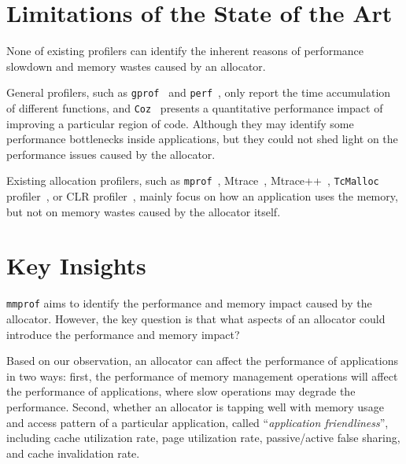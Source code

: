 \documentclass[pageno]{jpaper}
\newcommand{\MP}{\texttt{mmprof}}
\begin{document}
\section{Limitations of the State of the Art}
\label{sec:limitations}

None of existing profilers can identify the inherent reasons of performance slowdown and memory wastes caused by an allocator. 

General profilers, such as \texttt{gprof}~\cite{DBLP:conf/sigplan/GrahamKM82} and \texttt{perf}~\cite{perf}, only report the time accumulation of different functions, and \texttt{Coz}~\cite{Coz} presents a quantitative performance impact of improving a particular region of code. Although they may identify some performance bottlenecks inside applications, but they could not shed light on the performance issues caused by the allocator. 

 Existing allocation profilers, such as \texttt{mprof}~\cite{Zorn:1988:MAP:894814}, Mtrace~\cite{mtrace}, Mtrace++~\cite{Lee:2000:DMM:786772.787150}, \texttt{TcMalloc} profiler~\cite{tcmalloc-profiler}, or CLR profiler~\cite{lupasc2014dynamic}, mainly focus on how an application uses the memory, but not on memory wastes caused by the allocator itself. 


\section{Key Insights}
\label{sec:key-insights}


\MP{} aims to identify the performance and memory impact caused by the allocator. However, the key question is that what aspects of an allocator could introduce the performance and memory impact? 

Based on our observation, an allocator can affect the performance of applications in two ways: first, the performance of memory management operations will affect the performance of applications, where slow operations may degrade the performance.  Second, whether an allocator is tapping well with memory usage and access pattern of a particular application, called ``\textit{application friendliness}'', including cache utilization rate, page utilization rate, passive/active false sharing, and cache invalidation rate. 
\end{document}
